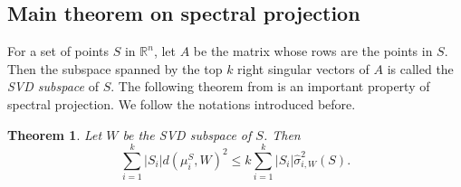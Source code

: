 \documentclass[11pt,letter]{article}
\newtheorem{theorem}{Theorem}
\begin{document}
\subsection{Main theorem on spectral projection}

For a set of points $S$ in $\mathbb R^n$, let $A$ be the matrix whose rows are the points in $S$. Then the subspace spanned by the top $k$ right singular vectors of $A$ is called the \emph{SVD subspace} of $S$. The following theorem from \cite{Kannan08spectral} is an important property of spectral projection. We follow the notations introduced before.

\begin{theorem}\label{thm:spectral-svd}
Let $W$ be the SVD subspace of $S$. Then
\[
\sum_{i=1}^k |S_i| d(\mu_i^S, W)^2 \le k \sum_{i=1}^k |S_i| \hat \sigma_{i, W}^2(S).
\]
\end{theorem}
\end{document}
